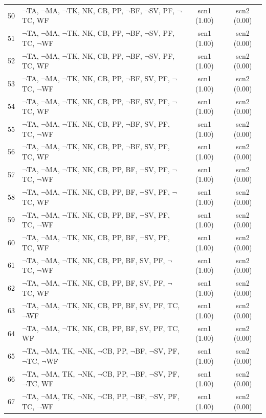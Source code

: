 \documentclass[12pt]{article}
\begin{document}
\begin{longtable}{|l|l|c|c|}
50 & $\neg$TA, $\neg$MA, $\neg$TK, NK, CB, PP, $\neg$BF, $\neg$SV, PF, $\neg$TC, WF & scn1 (1.00) & scn2 (0.00)\\
51 & $\neg$TA, $\neg$MA, $\neg$TK, NK, CB, PP, $\neg$BF, $\neg$SV, PF, TC, $\neg$WF & scn1 (1.00) & scn2 (0.00)\\
52 & $\neg$TA, $\neg$MA, $\neg$TK, NK, CB, PP, $\neg$BF, $\neg$SV, PF, TC, WF & scn1 (1.00) & scn2 (0.00)\\
53 & $\neg$TA, $\neg$MA, $\neg$TK, NK, CB, PP, $\neg$BF, SV, PF, $\neg$TC, $\neg$WF & scn1 (1.00) & scn2 (0.00)\\
54 & $\neg$TA, $\neg$MA, $\neg$TK, NK, CB, PP, $\neg$BF, SV, PF, $\neg$TC, WF & scn1 (1.00) & scn2 (0.00)\\
55 & $\neg$TA, $\neg$MA, $\neg$TK, NK, CB, PP, $\neg$BF, SV, PF, TC, $\neg$WF & scn1 (1.00) & scn2 (0.00)\\
56 & $\neg$TA, $\neg$MA, $\neg$TK, NK, CB, PP, $\neg$BF, SV, PF, TC, WF & scn1 (1.00) & scn2 (0.00)\\
57 & $\neg$TA, $\neg$MA, $\neg$TK, NK, CB, PP, BF, $\neg$SV, PF, $\neg$TC, $\neg$WF & scn1 (1.00) & scn2 (0.00)\\
58 & $\neg$TA, $\neg$MA, $\neg$TK, NK, CB, PP, BF, $\neg$SV, PF, $\neg$TC, WF & scn1 (1.00) & scn2 (0.00)\\
59 & $\neg$TA, $\neg$MA, $\neg$TK, NK, CB, PP, BF, $\neg$SV, PF, TC, $\neg$WF & scn1 (1.00) & scn2 (0.00)\\
60 & $\neg$TA, $\neg$MA, $\neg$TK, NK, CB, PP, BF, $\neg$SV, PF, TC, WF & scn1 (1.00) & scn2 (0.00)\\
61 & $\neg$TA, $\neg$MA, $\neg$TK, NK, CB, PP, BF, SV, PF, $\neg$TC, $\neg$WF & scn1 (1.00) & scn2 (0.00)\\
62 & $\neg$TA, $\neg$MA, $\neg$TK, NK, CB, PP, BF, SV, PF, $\neg$TC, WF & scn1 (1.00) & scn2 (0.00)\\
63 & $\neg$TA, $\neg$MA, $\neg$TK, NK, CB, PP, BF, SV, PF, TC, $\neg$WF & scn1 (1.00) & scn2 (0.00)\\
64 & $\neg$TA, $\neg$MA, $\neg$TK, NK, CB, PP, BF, SV, PF, TC, WF & scn1 (1.00) & scn2 (0.00)\\
65 & $\neg$TA, $\neg$MA, TK, $\neg$NK, $\neg$CB, PP, $\neg$BF, $\neg$SV, PF, $\neg$TC, $\neg$WF & scn1 (1.00) & scn2 (0.00)\\
66 & $\neg$TA, $\neg$MA, TK, $\neg$NK, $\neg$CB, PP, $\neg$BF, $\neg$SV, PF, $\neg$TC, WF & scn1 (1.00) & scn2 (0.00)\\
67 & $\neg$TA, $\neg$MA, TK, $\neg$NK, $\neg$CB, PP, $\neg$BF, $\neg$SV, PF, TC, $\neg$WF & scn1 (1.00) & scn2 (0.00)\\

\end{longtable}
\end{document}
